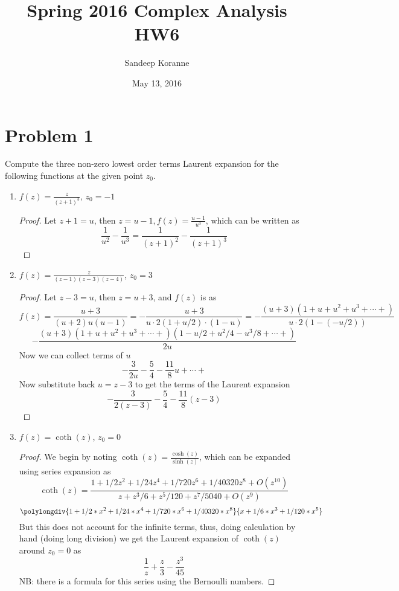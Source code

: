 \documentclass{article}[12pt]
\begin{document}
\title{Spring 2016 Complex Analysis HW6}
\author{Sandeep Koranne}
\date{May 13, 2016}
\maketitle


\section*{Problem 1}
Compute the three non-zero lowest order terms Laurent expansion for the following functions at the given point $z_0$.

\begin{enumerate}
\item{}$f(z)=\frac{z}{(z+1)^3}$, $z_0=-1$
\begin{proof}
Let $z+1=u$, then $z=u-1, f(z)=\frac{u-1}{u^3}$, which can be
written as
\[
\frac{1}{u^2}-\frac{1}{u^3} = \frac{1}{(z+1)^2} - \frac{1}{(z+1)^3}
\]
\end{proof}
\item{}$f(z)=\frac{z}{(z-1)(z-3)(z-4)}$, $z_0=3$
\begin{proof}
Let $z-3=u$, then $z=u+3$, and $f(z)$ is as
\[
f(z) = \frac{u+3}{(u+2)u(u-1)} = -\frac{u+3}{u\cdot 2(1+u/2)\cdot (1-u)}=
-\frac{(u+3)(1+u+u^2+u^3+\cdots+)}{u\cdot 2(1- (-u/2))} 
\]
\[
-\frac{(u+3)(1+u+u^2+u^3+\cdots+)(1-u/2+u^2/4-u^3/8+\cdots+)}{2u}
\]
Now we can collect terms of $u$
\[
-\frac{3}{2u} -\frac{5}{4} - \frac{11}{8}u + \cdots+
\]
Now substitute back $u=z-3$ to get the terms of the Laurent expansion
\[
-\frac{3}{2(z-3)} - \frac{5}{4} - \frac{11}{8}(z-3)
\]
\end{proof}
\item{}$f(z)=\coth(z)$, $z_0=0$
\begin{proof}
We begin by noting
$\coth(z)=\frac{\cosh(z)}{\sinh(z)}$, which can be expanded using
series expansion as
\[
\coth(z) = \frac{1+1/2z^2+1/24z^4+1/720z^6+1/40320z^8+O(z^{10})}
{z+z^3/6+z^5/120+z^7/5040+O(z^{9})}
\]
\[
\polylongdiv{1+1/2*x^2+1/24*x^4+1/720*x^6+1/40320*x^8}{x+1/6*x^3+1/120*x^5}
\]
But this does not account for the infinite terms, thus, doing
calculation by hand (doing long division)
we get the Laurent expansion of $\coth(z)$ around
$z_0=0$ as
\[
\frac{1}{z}+\frac{z}{3}-\frac{z^3}{45}
\]
NB: there is a formula for this series using the Bernoulli numbers.
\end{proof}

\end{enumerate}
\end{document}
